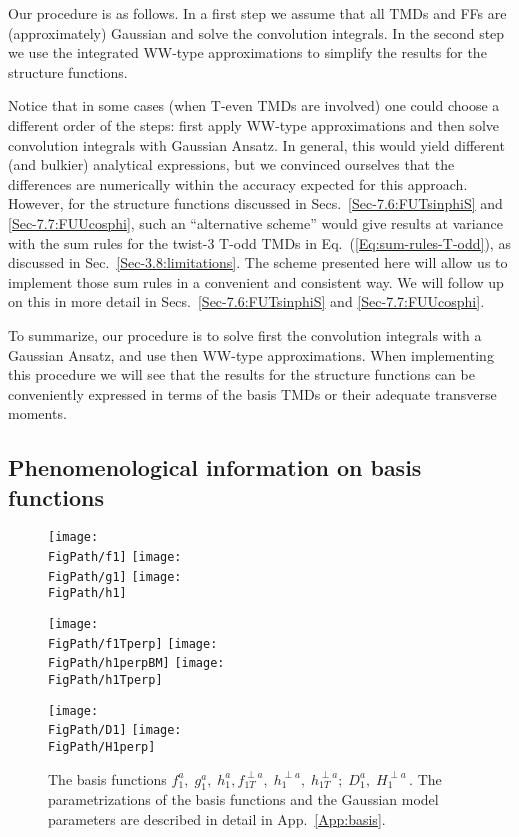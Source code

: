 \documentclass[a4paper,11pt]{article}
\newcommand*{\FigPath}{./figs}%
\begin{document}
Our procedure is as follows. In a first step we assume that all TMDs and
FFs are (approximately) Gaussian and solve the convolution integrals.
In the second step we use the integrated WW-type approximations to
simplify the results for the structure functions.

Notice that in some cases (when T-even TMDs are involved)
one could choose a different order of the steps: first apply
WW-type approximations and then solve convolution integrals
with Gaussian Ansatz.
In general, this would yield different (and bulkier) analytical
expressions, but we convinced ourselves that the differences
are numerically within the accuracy expected for this approach.
However, for the structure functions discussed in
Secs.~\ref{Sec-7.6:FUTsinphiS} and \ref{Sec-7.7:FUUcosphi},
such an ``alternative scheme'' would give results at
variance with the sum rules for the twist-3 T-odd TMDs
in Eq.~(\ref{Eq:sum-rules-T-odd}), as discussed in
Sec.~\ref{Sec-3.8:limitations}.
The scheme presented here will allow us to implement those sum
rules in a convenient and consistent way. We will follow up on
this in more detail in
Secs.~\ref{Sec-7.6:FUTsinphiS} and \ref{Sec-7.7:FUUcosphi}.

To summarize, our procedure is to solve first the convolution
integrals with a Gaussian Ansatz, and use then WW-type approximations.
When implementing this procedure we will see that the results
for the structure functions can be conveniently expressed in
terms of the basis TMDs or their adequate transverse moments.

\subsection{Phenomenological information on basis functions}
\label{Sec-4.3:plot-basis-functions}

\begin{figure}[b!]
\centering
\texttt{[image: \\FigPath/f1]}
\texttt{[image: \\FigPath/g1]}
\texttt{[image: \\FigPath/h1]}

\texttt{[image: \\FigPath/f1Tperp]}
\texttt{[image: \\FigPath/h1perpBM]}
\texttt{[image: \\FigPath/h1Tperp]}

\texttt{[image: \\FigPath/D1]}
\texttt{[image: \\FigPath/H1perp]}
\caption{\label{basis}
	The basis functions $f_1^a, \; g_1^a, \; h_1^a,
	f_{1T}^{\perp a}, \;h_1^{\perp a},\; h_{1T}^{\perp a}; \;
	D_1^a, \; H_1^{\perp a} \,$.
	The parametrizations of the basis functions and the Gaussian
	model parameters are described in detail in App.~\ref{App:basis}.}
\end{figure}
\end{document}
